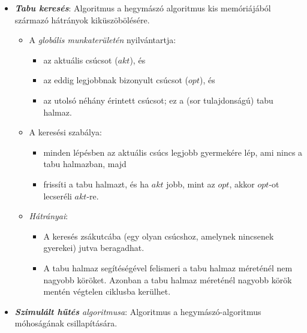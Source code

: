 \documentclass[12pt,margin=0px]{article}
\begin{document}
\begin{itemize}
\begin{itemize}
        \end{itemize}
        \newpage
		\item \textit{\textbf{Tabu keresés}}: Algoritmus a  hegymászó algoritmus kis memóriájából származó hátrányok kiküszöbölésére.
        \begin{itemize}
            \item A \emph{globális munkaterületén} nyilvántartja:
            \begin{itemize}
                \item az aktuális csúcsot ($akt$), és
                \item az eddig legjobbnak bizonyult csúcsot ($opt$), és
                \item az utolsó néhány érintett csúcsot; ez a (sor tulajdonságú) tabu halmaz.
            \end{itemize}
            \item A keresési szabálya:
            \begin{itemize}
                \item minden lépésben az aktuális csúcs legjobb gyermekére lép, ami nincs a tabu halmazban, majd
                \item frissíti a tabu halmazt, és ha $akt$ jobb, mint az $opt$, akkor $opt$-ot lecseréli $akt$-re.
            \end{itemize}
            \item \emph{Hátrányai}:
                \begin{itemize}
                    \item A keresés zsákutcába (egy olyan csúcshoz, amelynek nincsenek gyerekei) jutva beragadhat.
                    \item A tabu halmaz segítéségével felismeri a tabu halmaz méreténél nem nagyobb köröket. Azonban a tabu halmaz méreténél nagyobb körök mentén végtelen ciklusba kerülhet.\\
                \end{itemize}
        \end{itemize}
		\item \textit{\textbf{Szimulált hűtés} algoritmusa}: Algoritmus a hegymászó-algoritmus móhoságának csillapítására.
        \begin{itemize}

\end{itemize}
\end{itemize}
\end{document}
